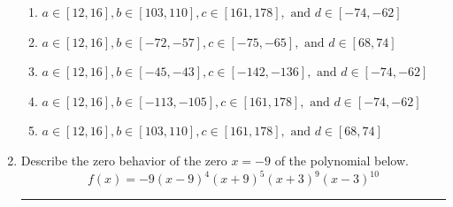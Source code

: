 \documentclass[14pt]{extbook}
\newcommand{\litem}[1]{\item#1\hspace*{-1cm}\rule{\textwidth}{0.4pt}}
\begin{document}
\begin{enumerate}
{\begin{enumerate}[label=\Alph*.]
\item \( a \in [12, 16], b \in [103, 110], c \in [161, 178], \text{ and } d \in [-74, -62] \)
\item \( a \in [12, 16], b \in [-72, -57], c \in [-75, -65], \text{ and } d \in [68, 74] \)
\item \( a \in [12, 16], b \in [-45, -43], c \in [-142, -136], \text{ and } d \in [-74, -62] \)
\item \( a \in [12, 16], b \in [-113, -105], c \in [161, 178], \text{ and } d \in [-74, -62] \)
\item \( a \in [12, 16], b \in [103, 110], c \in [161, 178], \text{ and } d \in [68, 74] \)

\end{enumerate} }
\litem{
Describe the zero behavior of the zero $x = -9$ of the polynomial below.\[ f(x) = -9(x - 9)^{4}(x + 9)^{5}(x + 3)^{9}(x - 3)^{10} \]\begin{enumerate}[label=\Alph*.]

\end{enumerate}}
\end{enumerate}
\end{document}
